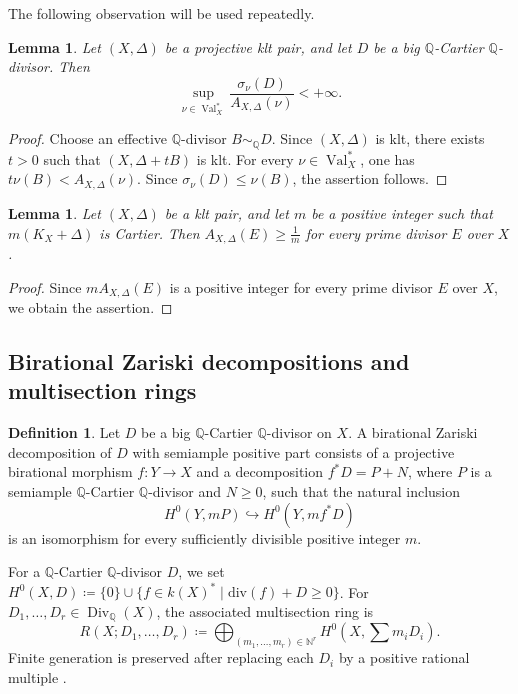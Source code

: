 \documentclass[a4paper,12pt]{amsart}
\newtheorem{lemma}[theorem]{Lemma}
\theoremstyle{plain}
\theoremstyle{definition}
\newtheorem{definition}[theorem]{Definition}
\numberwithin{equation}{section}
\newcommand{\N}{\mathbb{N}}
\newcommand{\Q}{\mathbb{Q}}
\DeclareMathOperator{\Val}{Val}
\DeclareMathOperator{\Div}{Div}
\begin{document}
The following observation will be used repeatedly.
\begin{lemma}\label{lem:sup}
    Let \((X,\Delta)\) be a projective klt pair, and let \(D\) be a big \(\Q\)-Cartier \(\Q\)-divisor. Then
    \[
    \sup_{\nu\in \Val_X^{\ast}}\frac{\sigma_{\nu}(D)}{A_{X,\Delta}(\nu)}<+\infty.
    \]
\end{lemma}
\begin{proof}
    Choose an effective \(\Q\)-divisor \(B\sim_{\Q} D\). Since \((X,\Delta)\) is klt, there exists \(t>0\) such that \((X,\Delta+tB)\) is klt. For every \(\nu\in \Val_X^{\ast}\), one has \(t\nu(B)<A_{X,\Delta}(\nu)\). Since \(\sigma_{\nu}(D)\leq \nu(B)\), the assertion follows.
\end{proof}

\begin{lemma}\label{lem-logdiscr}
    Let $(X,\Delta)$ be a klt pair, and let $m$ be a positive integer such that $m(K_X+\Delta)$ is Cartier. Then $A_{X,\Delta}(E)\geq \frac{1}{m}$ for every prime divisor $E$ over $X$.
\end{lemma}
\begin{proof}
    Since $mA_{X,\Delta}(E)$ is a positive integer for every prime divisor $E$ over $X$, we obtain the assertion.
\end{proof}

\subsection{Birational Zariski decompositions and multisection rings}
\begin{definition}
    Let \(D\) be a big \(\Q\)-Cartier \(\Q\)-divisor on \(X\). A birational Zariski decomposition of \(D\) with semiample positive part consists of a projective birational morphism \(f\colon Y\to X\) and a decomposition $f^{\ast}D=P+N$, where \(P\) is a semiample \(\Q\)-Cartier \(\Q\)-divisor and \(N\geq 0\), such that the natural inclusion
    \[
    H^0(Y,mP)\hookrightarrow H^0(Y,mf^{\ast}D)
    \]
    is an isomorphism for every sufficiently divisible positive integer \(m\).
\end{definition}

For a $\Q$-Cartier $\Q$-divisor $D$, we set $H^0(X,D)\coloneqq \{0\}\cup\{f\in k(X)^{\ast}\mid \mathrm{div}(f)+D\ge 0\}$. For $D_1,\dots,D_r\in\Div_{\Q}(X)$, the associated multisection ring is
\[
R(X;D_1,\dots,D_r)
\coloneqq
\bigoplus_{(m_1,\dots,m_r)\in\N^r}
H^0\!\left(X,\sum m_iD_i\right).
\]
Finite generation is preserved after replacing each $D_i$ by a positive rational multiple \cite[Lemma 3.1]{KKL}.
\end{document}
